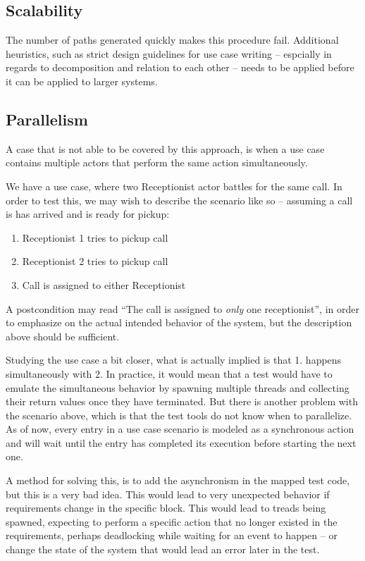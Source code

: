 \subsection{Scalability}
\label{sec:scalability}
The number of paths generated quickly makes this procedure fail. Additional heuristics, such as strict design guidelines for use case writing -- espcially in regards to decomposition and relation to each other -- needs to be applied before it can be applied to larger systems.



\subsection{Parallelism}
\label{sec:parallelism}
A case that is not able to be covered by this approach, is when a use case contains multiple actors that perform the same action simultaneously.\medskip

\noindent We have a use case, where two Receptionist actor battles for the same call. In order to test this, we may wish to describe the scenario like so -- assuming a call is has arrived and is ready for pickup:
\begin{enumerate}
 \item Receptionist 1 tries to pickup call
 \item Receptionist 2 tries to pickup call
 \item Call is assigned to either Receptionist
\end{enumerate}
A postcondition may read ``The call is assigned to \emph{only} one receptionist'', in order to emphasize on the actual intended behavior of the system, but the description above should be sufficient.\medskip

\noindent Studying the use case a bit closer, what is actually implied is that 1. happens simultaneously with 2. In practice, it would mean that a test would have to emulate the simultaneous behavior by spawning multiple threads and collecting their return values once they have terminated. But there is another problem with the scenario above, which is that the test tools do not know when to parallelize. As of now, every entry in a use case scenario is modeled as a synchronous action and will wait until the entry has completed its execution before starting the next one.\medskip

\noindent A method for solving this, is to add the asynchronism in the mapped test code, but this is a very bad idea. This would lead to very unexpected behavior if requirements change in the specific block. This would lead to treads being spawned, expecting to perform a specific action that no longer existed in the requirements, perhaps deadlocking while waiting for an event to happen -- or change the state of the system that would lead an error later in the test.\medskip

